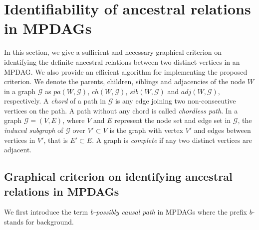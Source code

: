 \documentclass{article}
\begin{document}

\section{Identifiability of ancestral relations in MPDAGs}\label{sec: Identifiability of Ancestral Relations in MPDAGs}

In this section, we give a sufficient and necessary graphical criterion on identifying the definite ancestral relations between two distinct vertices in an MPDAG. We also provide an efficient algorithm for implementing the proposed criterion. We denote the parents, children, siblings and adjacencies of the node $W$ in a graph $\mathcal{G}$ as $pa(W, \mathcal{G})$, $ch(W, \mathcal{G})$, $sib(W, \mathcal{G})$ and $adj(W, \mathcal{G})$, respectively. A \textit{chord} of a path in $\mathcal{G}$ is any edge joining two non-consecutive vertices on the path. A path without any chord is called \textit{chordless path}. In a graph $\mathcal{G}=(V,E)$, where $V$ and $E$ represent the node set and edge set in $\mathcal{G}$, the \textit{induced subgraph} of $\mathcal{G}$ over $V' \subset V$ is the graph with vertex $V'$ and edges between vertices in $V'$, that is $E' \subset E$. A graph is \textit{complete} if any two distinct vertices are adjacent. 

\subsection{Graphical criterion on identifying ancestral relations in MPDAGs}\label{sec: Graphical criterion}

We first introduce the term \textit{b-possibly causal path} \citep{perkovic2017interpreting} in MPDAGs where the prefix $b$- stands for background.
\end{document}
